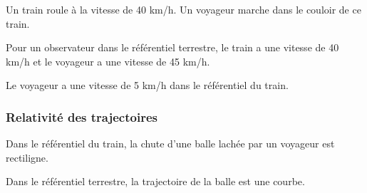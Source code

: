 Un train roule à la vitesse de 40 km/h. Un voyageur marche dans le couloir de ce train.

\begin{center}

\end{center}

Pour un observateur dans le référentiel terrestre, le train a une vitesse de 40 km/h et le voyageur a une vitesse de 45 km/h. 

Le voyageur a une vitesse de 5 km/h dans le référentiel du train.

    \subsubsection{Relativité des trajectoires}

Dans le référentiel du train, la chute d'une balle lachée par un voyageur est rectiligne.

Dans le référentiel terrestre, la trajectoire de la balle est une courbe.





